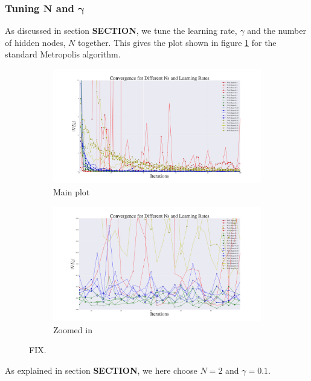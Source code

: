\documentclass[a4paper, 10pt]{article}
\begin{document}
\subsubsection{Tuning $\boldsymbol{N}$ and $\boldsymbol{\gamma}$}
As discussed in section \textbf{SECTION}, we tune the learning rate, $\gamma$ and the number of hidden nodes, $N$ together. This gives the plot shown in figure \ref{fig:step_size_and_N_interacting} for the standard Metropolis algorithm.
\begin{figure}[ht!]
	\centering
	\begin{subfigure}[b]{0.8\textwidth}
	\centering
	\includegraphics[width=\textwidth]{../Results/grad_normal_interacting.pdf}
	\caption{Main plot}
	\end{subfigure}
	\begin{subfigure}[b]{0.8\textwidth}
	\centering
	\includegraphics[width=\textwidth]{../Results/grad_normal_interacting_zoom.pdf}
	\caption{Zoomed in}
	\end{subfigure}
	\caption{FIX.}\label{fig:step_size_and_N_interacting}
\end{figure}
As explained in section \textbf{SECTION}, we here choose $N=2$ and $\gamma=0.1$.
\end{document}
